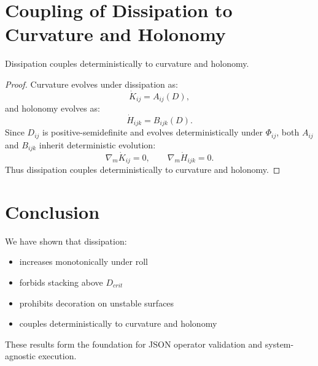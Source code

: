 \documentclass[12pt]{article}
\begin{document}
\section{Coupling of Dissipation to Curvature and Holonomy}

\begin{theorem}
Dissipation couples deterministically to curvature and holonomy.
\end{theorem}

\begin{proof}
Curvature evolves under dissipation as:
\[
\dot{K}_{ij} = A_{ij}(D),
\]
and holonomy evolves as:
\[
\dot{H}_{ijk} = B_{ijk}(D).
\]
Since $D_{ij}$ is positive-semidefinite and evolves deterministically under
$\Phi_{ij}$, both $A_{ij}$ and $B_{ijk}$ inherit deterministic evolution:
\[
\nabla_m \dot{K}_{ij} = 0, \qquad
\nabla_m \dot{H}_{ijk} = 0.
\]
Thus dissipation couples deterministically to curvature and holonomy.
\end{proof}

\section*{Conclusion}
We have shown that dissipation:

\begin{itemize}
    \item increases monotonically under roll
    \item forbids stacking above $D_{crit}$
    \item prohibits decoration on unstable surfaces
    \item couples deterministically to curvature and holonomy
\end{itemize}

These results form the foundation for JSON operator validation and
system-agnostic execution.
\end{document}
